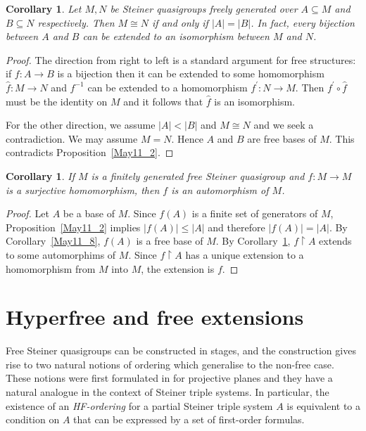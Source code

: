 \documentclass[a4paper, 11pt]{article}
\theoremstyle{note}
\newtheorem{cor}[thm]{Corollary}
\begin{document}
	\begin{cor}\label{May11_9.1} Let $M,N$ be Steiner quasigroups freely generated over $A\subseteq M$ and $B\subseteq N$ respectively. Then $M\cong N$ if and only if $|A|=|B|$. In fact, every bijection between $A$ and $B$ can be extended  to an isomorphism between $M$ and $N$.
	\end{cor}
	\begin{proof} The direction from right to left is a standard argument for free structures:  if  $f:A\rightarrow B$ is a bijection then it can be extended to some homomorphism $\hat{f}: M\rightarrow N$  and $f^{-1}$ can be extended to a homomorphism  $f^\prime: N\rightarrow M$.  Then $f^\prime\circ \hat{f}$  must be the identity on $M$  and it follows that $\hat{f}$ is an isomorphism.
		
		For the other direction, we assume $|A|<|B|$ and $M\cong N$ and we seek a contradiction. We may assume $M=N$. Hence $A$ and $B$ are free bases of $M$. This contradicts Proposition~\ref{May11_2}. 
	\end{proof}
	
	\begin{cor}\label{May11_9.2}
		If $M$ is a finitely generated free Steiner quasigroup and $f:M\rightarrow M$ is a surjective homomorphism, then $f$ is an automorphism of $M$.
	\end{cor}
	\begin{proof} Let $A$ be a base of $M$. Since $f(A)$ is a finite set of generators of $M$, Proposition~\ref{May11_2} implies $|f(A)|\leq |A|$  and therefore $|f(A)|=|A|$. By Corollary~\ref{May11_8}, $f(A)$ is a free base of $M$. By Corollary~\ref{May11_9.1}, $f\restriction A$ extends to some automorphims of $M$. Since $f\restriction A$ has a unique extension to a homomorphism from $M$ into $M$, the extension is $f$.
	\end{proof}
	
	
	\section{Hyperfree and free extensions}
Free Steiner quasigroups can be constructed in stages, and the construction gives rise to two natural notions of ordering which generalise to the non-free case.  These notions were first formulated in \cite{sieben} for projective planes and they have a natural analogue in the context of Steiner triple systems. In particular, the existence of an \textit{HF-ordering} for a partial Steiner triple system $A$ is equivalent to a condition on $A$ that can be expressed by a set of first-order formulas. 
\end{document}
